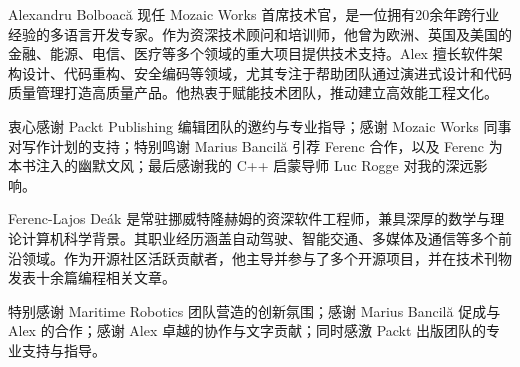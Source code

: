 ﻿Alexandru Bolboacă 现任 Mozaic Works 首席技术官，是一位拥有20余年跨行业经验的多语言开发专家。作为资深技术顾问和培训师，他曾为欧洲、英国及美国的金融、能源、电信、医疗等多个领域的重大项目提供技术支持。Alex 擅长软件架构设计、代码重构、安全编码等领域，尤其专注于帮助团队通过演进式设计和代码质量管理打造高质量产品。他热衷于赋能技术团队，推动建立高效能工程文化。

衷心感谢 Packt Publishing 编辑团队的邀约与专业指导；感谢 Mozaic Works 同事对写作计划的支持；特别鸣谢 Marius Bancilă 引荐 Ferenc 合作，以及 Ferenc 为本书注入的幽默文风；最后感谢我的 C++ 启蒙导师 Luc Rogge 对我的深远影响。

\hspace*{\fill}

Ferenc-Lajos Deák 是常驻挪威特隆赫姆的资深软件工程师，兼具深厚的数学与理论计算机科学背景。其职业经历涵盖自动驾驶、智能交通、多媒体及通信等多个前沿领域。作为开源社区活跃贡献者，他主导并参与了多个开源项目，并在技术刊物发表十余篇编程相关文章。

特别感谢 Maritime Robotics 团队营造的创新氛围；感谢 Marius Bancilă 促成与 Alex 的合作；感谢 Alex 卓越的协作与文字贡献；同时感激 Packt 出版团队的专业支持与指导。